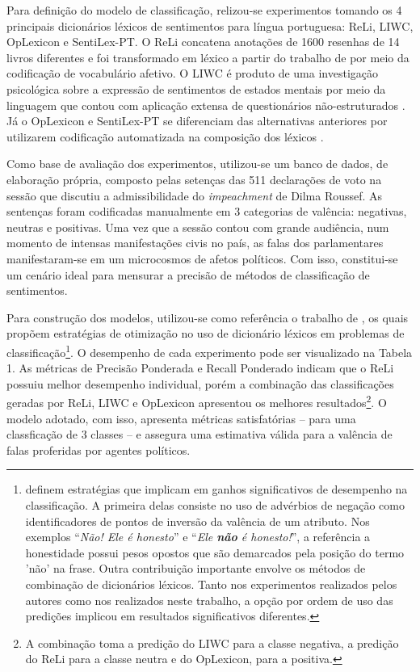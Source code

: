 \documentclass[
12pt,				%
openright,			%
twoside,			%
a4paper,			%
english,			%
french,				%
spanish,			%
brazil				%
]{abntex2}
\begin{document}
Para definição do modelo de classificação, relizou-se experimentos tomando os 4 principais dicionários léxicos de sentimentos para língua portuguesa: ReLi, LIWC, OpLexicon e SentiLex-PT. O ReLi concatena anotações de 1600 resenhas de 14 livros diferentes \cite{freitas2012vampiro, freitas2014sparkling} e foi transformado em léxico a partir do trabalho de  por meio da codificação de vocabulário afetivo. O LIWC é produto de uma investigação psicológica sobre a expressão de sentimentos de estados mentais por meio da linguagem que contou com aplicação extensa de questionários não-estruturados \cite{pennebaker1996cognitive, pennebaker1997linguistic}. Já o OpLexicon e SentiLex-PT se diferenciam das alternativas anteriores por utilizarem codificação automatizada na composição dos léxicos \cite{souza2011construction, carvalho2015sentilex}.

Como base de avaliação dos experimentos, utilizou-se um banco de dados, de elaboração própria, composto pelas setenças das 511 declarações de voto na sessão que discutiu a admissibilidade do \emph{impeachment} de Dilma Roussef. As sentenças foram codificadas manualmente em 3 categorias de valência: negativas, neutras e positivas. Uma vez que a sessão contou com grande audiência, num momento de intensas manifestações civis no país, as falas dos parlamentares manifestaram-se em um microcosmos de afetos políticos. Com isso, constitui-se um cenário ideal para mensurar a precisão de métodos de classificação de sentimentos.   

Para construção dos modelos, utilizou-se como referência o trabalho de , os quais propõem estratégias de otimização no uso de dicionário léxicos em problemas de classificação\footnote{ definem estratégias que implicam em ganhos significativos de desempenho na classificação. A primeira delas consiste no uso de advérbios de negação como identificadores de pontos de inversão da valência de um atributo. Nos exemplos ``\textit{Não! Ele é honesto}'' e ``\textit{Ele \textbf{não} é honesto!}'', a referência a honestidade possui pesos opostos que são demarcados pela posição do termo 'não' na frase. Outra contribuição importante envolve os métodos de combinação de dicionários léxicos. Tanto nos experimentos realizados pelos autores como nos realizados neste trabalho, a opção por ordem de uso das predições implicou em resultados significativos diferentes.}. O desempenho de cada experimento pode ser visualizado na Tabela 1. As métricas de Precisão Ponderada e Recall Ponderado indicam que o ReLi possuiu melhor desempenho individual, porém a combinação das classificações geradas por ReLi, LIWC e OpLexicon apresentou os melhores resultados\footnote{A combinação toma a predição do LIWC para a classe negativa, a predição do ReLi para a classe neutra e do OpLexicon, para a positiva.}. O modelo adotado, com isso, apresenta métricas satisfatórias -- para uma classficação de 3 classes -- e assegura uma estimativa válida para a valência de falas proferidas por agentes políticos.   
\end{document}
